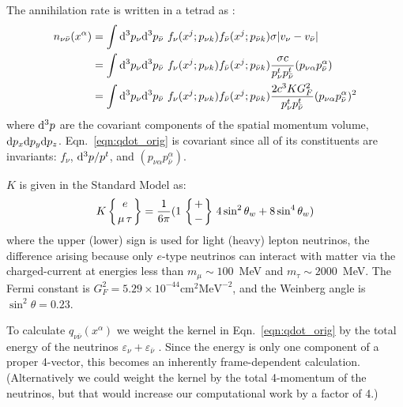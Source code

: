 The annihilation rate is written in a tetrad as \cite{goodman87}:
\begin{align}
  \label{eqn:qdot_orig}
  n_{\nu \bar{\nu}}(x^\alpha)
  &= \int \mathrm{d}^3p_{\nu} \mathrm{d}^3p_{\bar{\nu}} \,\,
  f_{\nu}(x^j;p_{\nu k})
  f_{\bar{\nu}}(x^j;p_{\bar{\nu} k})
  \sigma |v_\nu-v_{\bar{\nu}}| \nonumber \\
  &= \int \mathrm{d}^3p_\nu \mathrm{d}^3p_{\bar{\nu}} \,\,
  f_{\nu}(x^j;p_{\nu k})
  f_{\bar{\nu}}(x^j;p_{\bar{\nu} k})
  \frac{\sigma c}{p_{\nu}^t p_{\bar{\nu}}^t} (p_{\nu \alpha}  p_{\bar{\nu}}^\alpha) \nonumber \\
  &= \int \mathrm{d}^3p_{\nu} \mathrm{d}^3p_{\bar{\nu}} \,\,
  f_{\nu}(x^j;p_{\nu k})
  f_{\bar{\nu}}(x^j;p_{\bar{\nu} k})
  \frac{2 c^3 K G_F^2}{p_{\nu}^t p_{\bar{\nu}}^t}
  (p_{\nu \alpha} p_{\bar{\nu}}^\alpha)^2
\end{align}
where $\mathrm{d}^3p$ are the covariant components of the spatial momentum volume,
$\mathrm{d} p_x \mathrm{d} p_y \mathrm{d} p_z$.
Eqn.~\ref{eqn:qdot_orig} is covariant since all of its constituents are
invariants: $f_\nu$, $\mathrm{d}^3p/p^t$, and $(p_{\nu \alpha} p_{\bar{\nu}}^\alpha)$.

$K$ is given in the Standard Model as:
\begin{equation}
  K \left\{{e \atop \mu \, \tau}\right\} = \frac{1}{6\pi}
  (1 \, \left\{{+ \atop -}\right\}
  \, 4 \sin^2 \theta_w + 8 \sin^4 \theta_w) \nonumber
\end{equation}
where the upper (lower) sign is used for light (heavy) lepton neutrinos,
the difference arising because only $e$-type neutrinos can interact with
matter via the charged-current at energies less than $m_\mu\sim100$~MeV
and $m_\tau\sim2000$~MeV.
The Fermi constant is $G_F^2 = 5.29 \times 10^{-44} \text{cm}^2 \text{MeV}^{-2}$,
and the Weinberg angle is $\sin^2 \theta = 0.23$.

To calculate $q_{\nu \bar{\nu}}(x^\alpha)$ we weight the kernel in
Eqn.~\ref{eqn:qdot_orig} by the total energy of the neutrinos
$\varepsilon_{\nu} + \varepsilon_{\bar{\nu}}$ \cite{asano00, salmonson99}.
Since the energy is only one component of a proper 4-vector, this becomes an
inherently frame-dependent calculation.
(Alternatively we could weight the kernel by the total 4-momentum of the
neutrinos, but that would increase our computational work by a factor of 4.)


